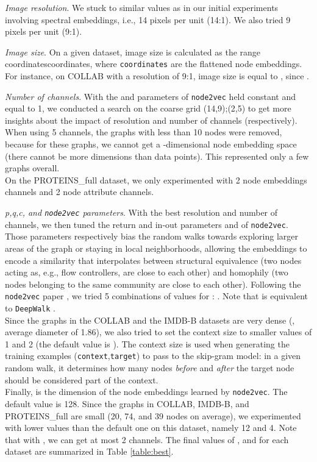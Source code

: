 \documentclass[runningheads]{llncs}
\begin{document}
\textit{Image resolution}. We stuck to similar values as in our initial experiments involving spectral embeddings, i.e., 14 pixels per unit (14:1). We also tried 9 pixels per unit (9:1).

\textit{Image size}. On a given dataset, image size is calculated as the range \newline coordinatescoordinates, where \texttt{coordinates} are the flattened node embeddings. For instance, on COLLAB with a resolution of 9:1, image size is equal to , since .

\textit{Number of channels}. With the  and  parameters of \texttt{node2vec} held constant and equal to 1, we conducted a search on the coarse grid (14,9);(2,5) to get more insights about the impact of resolution and number of channels (respectively). When using 5 channels, the graphs with less than 10 nodes were removed, because for these graphs, we cannot get a -dimensional node embedding space (there cannot be more dimensions than data points). This represented only a few graphs overall. \\ 
On the PROTEINS\_full dataset, we only experimented with 2 node embeddings channels and 2 node attribute channels.

\textit{p,q,c, and  \texttt{node2vec} parameters}. With the best resolution and number of channels, we then tuned the return and in-out parameters  and  of \texttt{node2vec}. Those parameters respectively bias the random walks towards exploring larger areas of the graph or staying in local neighborhoods, allowing the embeddings to encode a similarity that interpolates between structural equivalence (two nodes acting as, e.g., flow controllers, are close to each other) and homophily (two nodes belonging to the same community are close to each other). Following the \texttt{node2vec} paper \cite{grover2016node2vec}, we tried 5 combinations of values for : . Note that  is equivalent to \texttt{DeepWalk} \cite{perozzi2014deepwalk}.\\
Since the graphs in the COLLAB and the IMDB-B datasets are very dense (, average diameter of 1.86), we also tried to set the context size  to smaller values of 1 and 2 (the default value is ). The context size is used when generating the training examples (\texttt{context},\texttt{target}) to pass to the skip-gram model: in a given random walk, it determines how many nodes \textit{before} and \textit{after} the target node should be considered part of the context.\\
Finally,  is the dimension of the node embeddings learned by \texttt{node2vec}. The default value is 128. Since the graphs in COLLAB, IMDB-B, and PROTEINS\_full are small (20, 74, and 39 nodes on average), we experimented with lower values than the default one on this dataset, namely 12 and 4. Note that with , we can get at most 2 channels. The final values of , and  for each dataset are summarized in Table \ref{table:best}. 
\end{document}
